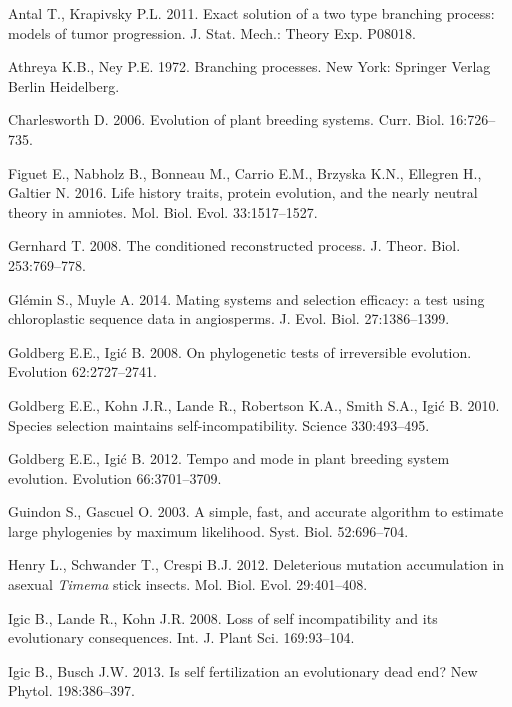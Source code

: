 \documentclass[a4paper,11pt]{article}
\theoremstyle{plain}
\theoremstyle{definition}
\numberwithin{equation}{section}
\begin{document}
\begin{thebibliography}{}


Antal T., Krapivsky P.L. 2011. Exact solution of a two type branching process: models of tumor progression. 
J. Stat. Mech.: Theory Exp. P08018.

Athreya K.B., Ney P.E. 1972. Branching processes. New York: Springer Verlag Berlin Heidelberg.

Charlesworth D. 2006. Evolution of plant breeding systems. Curr. Biol. 16:726--735.

Figuet E., Nabholz B., Bonneau M., Carrio E.M., Brzyska K.N., Ellegren H., Galtier N. 2016. 
Life history traits, protein evolution, and the nearly neutral theory in amniotes. Mol. Biol. Evol. 33:1517--1527.



Gernhard T. 2008. The conditioned reconstructed process. J. Theor. Biol. 253:769--778. 



Gl{\'e}min S., Muyle A. 2014. Mating systems and selection efficacy: a test using chloroplastic sequence data in angiosperms. 
J. Evol. Biol. 27:1386--1399.

Goldberg E.E., Igi{\'c} B. 2008. On phylogenetic tests of irreversible evolution. Evolution 62:2727--2741.

Goldberg E.E., Kohn J.R., Lande R., Robertson K.A., Smith S.A., Igi{\'c} B. 2010. Species 
selection maintains self-incompatibility. Science 330:493--495.

Goldberg E.E., Igi{\'c} B. 2012. Tempo and mode in plant breeding system evolution. Evolution 66:3701--3709.

Guindon S., Gascuel O. 2003. A simple, fast, and accurate algorithm to estimate large phylogenies by 
maximum likelihood. Syst. Biol. 52:696--704.


Henry L., Schwander T., Crespi B.J. 2012. 
Deleterious mutation accumulation in asexual \textit{Timema} stick insects. Mol. Biol. Evol. 29:401--408.


Igic B., Lande R., Kohn J.R. 2008. Loss of self incompatibility and its evolutionary consequences. Int. J. Plant Sci. 169:93--104.

Igic B., Busch J.W. 2013. Is self fertilization an evolutionary dead end? New Phytol. 198:386--397.
 

\end{thebibliography}
\end{document}
